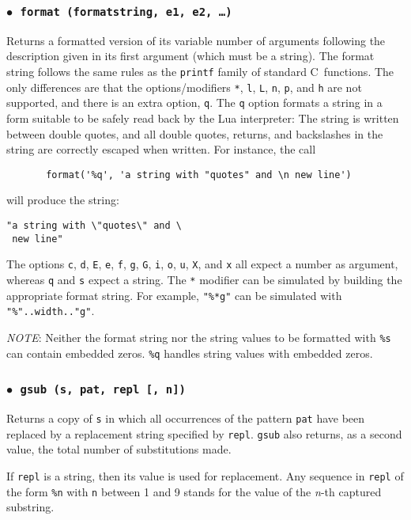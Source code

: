 \documentclass[11pt]{article}
\makeatletter
\newcommand{\M}[1]{{\rm\emph{#1}}}
\newcommand{\T}[1]{{\tt #1}}
\newcommand{\DefLIB}[1]{\index{#1@{\tt #1}}}
\newcommand{\ff}{$\bullet$\ }
\newcommand{\NOTE}{\par\medskip\noindent\emph{NOTE}: }
\makeatother
\begin{document}
\subsubsection*{\ff \T{format (formatstring, e1, e2, \ldots)}}\DefLIB{format}
\label{format}
Returns a formatted version of its variable number of arguments
following the description given in its first argument (which must be a string).
The format string follows the same rules as the \verb|printf| family of
standard C~functions.
The only differences are that the options/modifiers
\verb|*|, \verb|l|, \verb|L|, \verb|n|, \verb|p|,
and \verb|h| are not supported,
and there is an extra option, \verb|q|.
The \verb|q| option formats a string in a form suitable to be safely read
back by the Lua interpreter:
The string is written between double quotes,
and all double quotes, returns, and backslashes in the string
are correctly escaped when written.
For instance, the call
\begin{verbatim}
       format('%q', 'a string with "quotes" and \n new line')
\end{verbatim}
will produce the string:
\begin{verbatim}
"a string with \"quotes\" and \
 new line"
\end{verbatim}

The options \verb|c|, \verb|d|, \verb|E|, \verb|e|, \verb|f|,
\verb|g|, \verb|G|, \verb|i|, \verb|o|, \verb|u|, \verb|X|, and \verb|x| all
expect a number as argument,
whereas \verb|q| and \verb|s| expect a string.
The \verb|*| modifier can be simulated by building
the appropriate format string.
For example, \verb|"%*g"| can be simulated with
\verb|"%"..width.."g"|.

\NOTE
Neither the format string nor the string values to be formatted with
\verb|%s| can contain embedded zeros.
\verb|%q| handles string values with embedded zeros.

\subsubsection*{\ff \T{gsub (s, pat, repl [, n])}}
\DefLIB{gsub}
Returns a copy of \verb|s|
in which all occurrences of the pattern \verb|pat| have been
replaced by a replacement string specified by \verb|repl|.
\verb|gsub| also returns, as a second value,
the total number of substitutions made.

If \verb|repl| is a string, then its value is used for replacement.
Any sequence in \verb|repl| of the form \verb|%n|
with \verb|n| between 1 and 9
stands for the value of the \M{n}-th captured substring.
\end{document}
